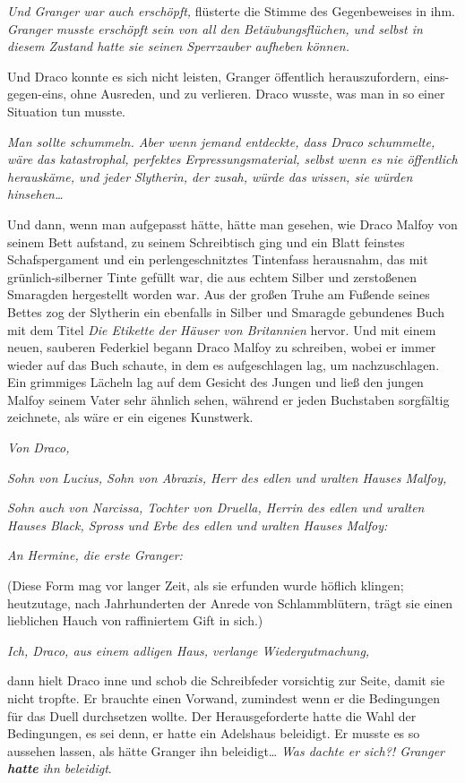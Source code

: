 {\emph{Und Granger war auch erschöpft,} flüsterte die Stimme des Gegenbeweises in ihm. \emph{Granger musste erschöpft sein von all den Betäubungsflüchen, und selbst in diesem Zustand hatte sie seinen Sperrzauber aufheben können.}

Und Draco konnte es sich nicht leisten, Granger öffentlich herauszufordern, eins-gegen-eins, ohne Ausreden, und zu verlieren. Draco wusste, was man in so einer Situation tun musste.

\emph{Man sollte schummeln. Aber wenn jemand entdeckte, dass Draco schummelte, wäre das katastrophal, perfektes Erpressungsmaterial, selbst wenn es nie öffentlich herauskäme, und jeder Slytherin, der zusah, würde das wissen, sie würden hinsehen…}

Und dann, wenn man aufgepasst hätte, hätte man gesehen, wie Draco Malfoy von seinem Bett aufstand, zu seinem Schreibtisch ging und ein Blatt feinstes Schafspergament und ein perlengeschnitztes Tintenfass herausnahm, das mit grünlich-silberner Tinte gefüllt war, die aus echtem Silber und zerstoßenen Smaragden hergestellt worden war. Aus der großen Truhe am Fußende seines Bettes zog der Slytherin ein ebenfalls in Silber und Smaragde gebundenes Buch mit dem Titel \emph{Die Etikette der Häuser von Britannien} hervor. Und mit einem neuen, sauberen Federkiel begann Draco Malfoy zu schreiben, wobei er immer wieder auf das Buch schaute, in dem es aufgeschlagen lag, um nachzuschlagen. Ein grimmiges Lächeln lag auf dem Gesicht des Jungen und ließ den jungen Malfoy seinem Vater sehr ähnlich sehen, während er jeden Buchstaben sorgfältig zeichnete, als wäre er ein eigenes Kunstwerk.

\emph{Von Draco,}

\emph{Sohn von Lucius, Sohn von Abraxis, Herr des edlen und uralten Hauses Malfoy,}

\emph{Sohn auch von Narcissa, Tochter von Druella, Herrin des edlen und uralten Hauses Black, Spross und Erbe des edlen und uralten Hauses Malfoy:}

\emph{An Hermine, die erste Granger:}

(Diese Form mag vor langer Zeit, als sie erfunden wurde höflich klingen; heutzutage, nach Jahrhunderten der Anrede von Schlammblütern, trägt sie einen lieblichen Hauch von raffiniertem Gift in sich.)

\emph{Ich, Draco, aus einem adligen Haus, verlange Wiedergutmachung,}

dann hielt Draco inne und schob die Schreibfeder vorsichtig zur Seite, damit sie nicht tropfte. Er brauchte einen Vorwand, zumindest wenn er die Bedingungen für das Duell durchsetzen wollte. Der Herausgeforderte hatte die Wahl der Bedingungen, es sei denn, er hatte ein Adelshaus beleidigt. Er musste es so aussehen lassen, als hätte Granger ihn beleidigt… \emph{Was dachte er sich?! Granger} \textbf{\emph{hatte}} \emph{ihn beleidigt}.

}
